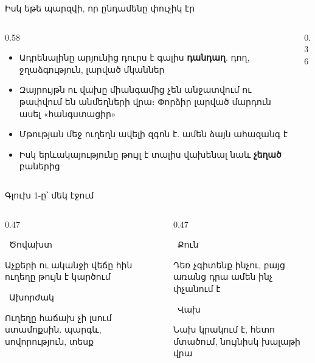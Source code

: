 \begin{frame}{Իսկ եթե պարզվի, որ ընդամենը փուչիկ էր}
  \begin{columns}[c]
    \begin{column}{0.58\textwidth}
      \begin{itemize}
        \item Ադրենալինը արյունից դուրս է գալիս \textbf{դանդաղ}. դող, ջղաձգություն, լարված մկաններ
        \item<2-> Զայրույթն ու վախը միանգամից չեն անջատվում ու թափվում են անմեղների վրա։ Փորձիր լարված մարդուն ասել «հանգստացիր» 
        \item<3-> Մթության մեջ ուղեղն ավելի զգոն է. ամեն ձայն ահազանգ է
        \item<4-> Իսկ երևակայությունը թույլ է տալիս վախենալ նաև \textbf{չեղած} բաներից
      \end{itemize}
    \end{column}
    \begin{column}{0.36\textwidth}
      \centering
      \par\medskip
    \end{column}
  \end{columns}
\end{frame}

\begin{frame}{Գլուխ 1-ը՝ մեկ էջում}
  \begin{columns}[T]
    \begin{column}{0.47\textwidth}
      \begin{card}\ {\blackfont Ծովախտ}\par Աչքերի ու ականջի վեճը հին ուղեղը թույն է կարծում\end{card}
      \begin{card}\ {\blackfont Ախորժակ}\par Ուղեղը հաճախ չի լսում ստամոքսին. պարգև, սովորություն, տեսք\end{card}
    \end{column}
    \begin{column}{0.47\textwidth}
      \begin{card}\ {\blackfont Քուն}\par Դեռ չգիտենք ինչու, բայց առանց դրա ամեն ինչ փչանում է\end{card}
      \begin{card}\ {\blackfont Վախ}\par Նախ կրակում է, հետո մտածում, նույնիսկ խալաթի վրա\end{card}
    \end{column}
  \end{columns}
  \vspace{0.5mm}
  \centering
\end{frame}
